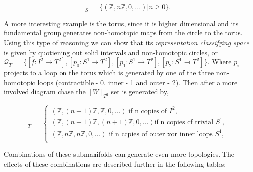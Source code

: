 \begin{equation}
    [W]_{S^1} = \{(\mathbb{Z},n\mathbb{Z},0,...)|n\geq0\}.
\end{equation}

A more interesting example is the torus, since it is higher dimensional and its fundamental group generates non-homotopic maps from the circle to the torus. Using this type of reasoning we can show that its \textit{representation classifying space} is given by quotiening out solid intervals and non-homotopic circles, or $\mathcal{Q}_{T^2} = \{[f: I^2 \to T^2], [p_0:S^1 \to T^2], [p_1:S^1 \to T^2], [p_2:S^1 \to T^2]\}$. Where $p_i$ projects to a loop on the torus which is generated by one of the three non-homotopic loops (contractible - 0, inner - 1 and outer - 2). Then after a more involved diagram chase the $[W]_{T^2}$ set is generated by,

\begin{equation}
    [W]_{T^2} = 
    \begin{cases}
        (\mathbb{Z},(n+1)\mathbb{Z},\mathbb{Z},0,...) \text{ if n copies of } I^2,\\
        (\mathbb{Z},(n+1)\mathbb{Z},(n+1)\mathbb{Z},0,...) \text{if n copies of trivial } S^1,\\
        (\mathbb{Z},n\mathbb{Z},n\mathbb{Z},0,...) \text{ if n copies of outer xor inner loops } S^1,\\
    \end{cases}
\end{equation}

Combinations of these submanifolds can generate even more topologies. The effects of these combinations are described further in the following tables:

